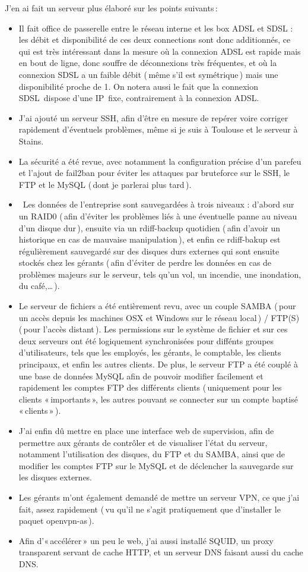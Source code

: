 \documentclass[10pt]{article}
\begin{document}
  J’en ai fait un serveur plus élaboré sur les points suivants\,:
  \begin{itemize}
   \item Il fait office de passerelle entre le réseau interne et les box ADSL et SDSL : les débit et disponibilité de ces deux connections sont donc additionnés, ce qui est très intéressant dans la mesure où la connexion ADSL est rapide mais en bout de ligne, donc souffre de déconnexions très fréquentes, et où la connexion SDSL a un faible débit (\,même s’il est symétrique\,) mais une disponibilité proche de 1. On notera aussi le fait que la connexion SDSL dispose d’une IP fixe, contrairement à la connexion ADSL.
   \item J’ai ajouté un serveur SSH, afin d’être en mesure de repérer voire corriger rapidement d’éventuels problèmes, même si je suis à Toulouse et le serveur à Stains.
   \item La sécurité a été revue, avec notamment la configuration précise d’un parefeu et l’ajout de fail2ban pour éviter les attaques par bruteforce sur le SSH, le FTP et le MySQL (\,dont je parlerai plus tard\,).
   \item Les données de l’entreprise sont sauvegardées à trois niveaux : d’abord sur un RAID0 (\,afin d’éviter les problèmes liés à une éventuelle panne au niveau d’un disque dur\,), ensuite via un rdiff-backup quotidien (\,afin d’avoir un historique en cas de mauvaise manipulation\,), et enfin ce rdiff-bakup est régulièrement sauvegardé sur des disques durs externes qui sont ensuite stockés chez les gérants (\,afin d’éviter de perdre les données en cas de problèmes majeurs sur le serveur, tels qu’un vol, un incendie, une inondation, du café,…\,).
   \item Le serveur de fichiers a été entièrement revu, avec un couple SAMBA (\,pour un accès depuis les machines OSX et Windows sur le réseau local\,) / FTP(S) (\,pour l’accès distant\,). Les permissions sur le système de fichier et sur ces deux serveurs ont été logiquement synchronisées pour diffénts groupes d’utilisateurs, tels que les employés, les gérants, le comptable, les clients principaux, et enfin les autres clients. De plus, le serveur FTP a été couplé à une base de données MySQL afin de pouvoir modifier facilement et rapidement les comptes FTP des différents clients (\,uniquement pour les clients «\,importants\,», les autres pouvant se connecter sur un compte baptisé «\,clients\,»\,).
   \item J’ai enfin dû mettre en place une interface web de supervision, afin de permettre aux gérants de contrôler et de visualiser l’état du serveur, notamment l’utilisation des disques, du FTP et du SAMBA, ainsi que de modifier les comptes FTP sur le MySQL et de déclencher la sauvegarde sur les disques externes.
   \item Les gérants m’ont également demandé de mettre un serveur VPN, ce que j’ai fait, assez rapidement (\,vu qu’il ne s’agit pratiquement que d’installer le paquet openvpn-as\,).
   \item Afin d’«\,accélérer\,» un peu le web, j’ai aussi installé SQUID, un proxy transparent servant de cache HTTP, et un serveur DNS faisant aussi du cache DNS.
  \end{itemize}
\end{document}
